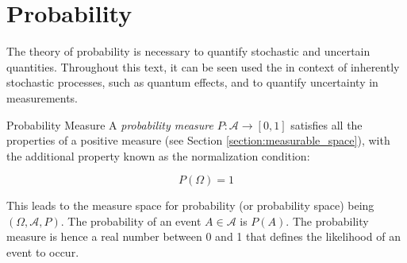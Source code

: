 \section{Probability}\label{section:probability-notation}
The theory of probability is necessary to quantify stochastic and uncertain quantities. Throughout this text, it can be seen used the in context of inherently stochastic processes, such as quantum effects, and to quantify uncertainty in measurements.

\begin{note}
    {Probability Measure}
A \textit{probability measure} $P: \mathcal{A} \to [0, 1]$ satisfies all the properties of a positive measure (see Section \ref{section:measurable_space}), with the additional property known as the normalization condition:

\begin{equation*}
    P(\Omega) = 1
\end{equation*}

This leads to the measure space for probability (or probability space) being $(\Omega, \mathcal{A}, P)$. The probability of an event $A \in \mathcal{A}$ is $P(A)$. The probability measure is hence a real number between 0 and 1 that defines the likelihood of an event to occur.
\end{note}




